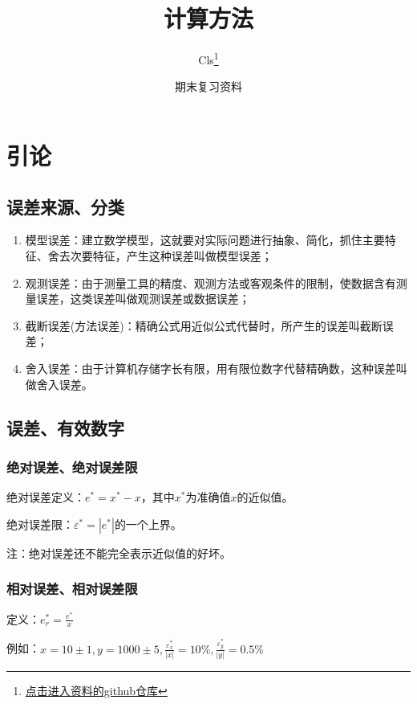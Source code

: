\documentclass[UTF8,a4paper,11pt,oneside]{ctexbook}
\title{计算方法}
\author{Cls\thanks{\href{https://github.com/Clignniis}{点击进入资料的github仓库}}}
\date{期末复习资料}
\begin{document}
\frontmatter

\maketitle

\tableofcontents

\mainmatter

\chapter{引论}

\section{误差来源、分类}
\begin{enumerate}
    \item 模型误差：建立数学模型，这就要对实际问题进行抽象、简化，抓住主要特征、舍去次要特征，产生这种误差叫做模型误差；
    \item 观测误差：由于测量工具的精度、观测方法或客观条件的限制，使数据含有测量误差，这类误差叫做观测误差或数据误差；
    \item 截断误差(方法误差)：精确公式用近似公式代替时，所产生的误差叫截断误差；
    \item 舍入误差：由于计算机存储字长有限，用有限位数字代替精确数，这种误差叫做舍入误差。
\end{enumerate}

\section{误差、有效数字}

\subsection{绝对误差、绝对误差限}

绝对误差定义：\(e^*=x^*-x\)，其中\(x^*\)为准确值\(x\)的近似值。

绝对误差限：\(\varepsilon^*=|e^*|\)的一个上界。

注：绝对误差还不能完全表示近似值的好坏。

\subsection{相对误差、相对误差限}

定义：\(e_r^*=\frac{e^*}{x}\)

例如：\(x=10\pm1,y=1000±5,\frac{\varepsilon_x^*}{|x|}=10\%,\frac{\varepsilon_y^*}{|y|}=0.5\%\)
\end{document}
